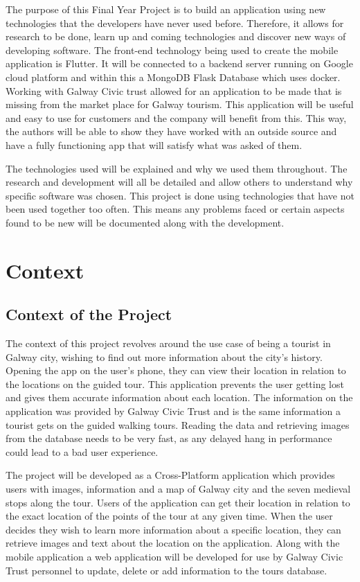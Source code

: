The purpose of this Final Year Project is to build an application using new technologies that the developers have never used before. Therefore, it allows for research to be done, learn up and coming technologies and discover new ways of developing software. The front-end technology being used to create the mobile application is Flutter. It will be connected to a backend server running on Google cloud platform and within this a MongoDB Flask Database which uses docker. Working with Galway Civic trust allowed for an application to be made that is missing from the market place for Galway tourism. This application will be useful and easy to use for customers and the company will benefit from this.  This way, the authors will be able to show they have worked with an outside source and have a fully functioning app that will satisfy what was asked of them.

The technologies used will be explained and why we used them throughout. The research and development will all be detailed and allow others to understand why specific software was chosen. This project is done using technologies that have not been used together too often. This means any problems faced or certain aspects found to be new will be documented along with the development.
\section{Context}

\subsection{Context of the Project}
The context of this project revolves around the use case of being a tourist in Galway city, wishing to find out more information about the city's history. Opening the app on the user’s phone, they can view their location in relation to the locations on the guided tour. This application prevents the user getting lost and gives them accurate information about each location. The information on the application was provided by Galway Civic Trust and is the same information a tourist gets on the guided walking tours. Reading the data and retrieving images from the database needs to be very fast, as any delayed hang in performance could lead to a bad user experience.

The project will be developed as a Cross-Platform application which provides users with images, information and a map of Galway city and the seven medieval stops along the tour. Users of the application can get their location in relation to the exact location of the points of the tour at any given time. When the user decides they wish to learn more information about a specific location, they can retrieve images and text about the location on the application. Along with the mobile application a web application will be developed for use by Galway Civic Trust personnel to update, delete or add information to the tours database.

